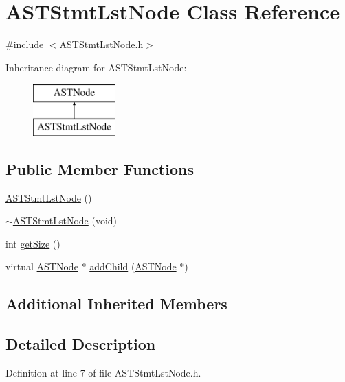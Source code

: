 \hypertarget{class_a_s_t_stmt_lst_node}{\section{A\-S\-T\-Stmt\-Lst\-Node Class Reference}
\label{class_a_s_t_stmt_lst_node}
}


{\ttfamily \#include $<$A\-S\-T\-Stmt\-Lst\-Node.\-h$>$}

Inheritance diagram for A\-S\-T\-Stmt\-Lst\-Node\-:\begin{figure}[H]
\begin{center}
\leavevmode
\includegraphics[height=2.000000cm]{class_a_s_t_stmt_lst_node}
\end{center}
\end{figure}
\subsection*{Public Member Functions}
\begin{DoxyCompactItemize}
\item 
\hyperlink{class_a_s_t_stmt_lst_node_a12c10755015930be83b22f9edd75f610}{A\-S\-T\-Stmt\-Lst\-Node} ()
\item 
\hyperlink{class_a_s_t_stmt_lst_node_a9d5ab5a42f1b92642e14d15a03a2e4e3}{$\sim$\-A\-S\-T\-Stmt\-Lst\-Node} (void)
\item 
int \hyperlink{class_a_s_t_stmt_lst_node_a49f21aa9b4b7836943762aee8f5ffae0}{get\-Size} ()
\item 
virtual \hyperlink{class_a_s_t_node}{A\-S\-T\-Node} $\ast$ \hyperlink{class_a_s_t_stmt_lst_node_a5424fe2ed759c533a1c26e6172dae45f}{add\-Child} (\hyperlink{class_a_s_t_node}{A\-S\-T\-Node} $\ast$)
\end{DoxyCompactItemize}
\subsection*{Additional Inherited Members}


\subsection{Detailed Description}


Definition at line 7 of file A\-S\-T\-Stmt\-Lst\-Node.\-h.



